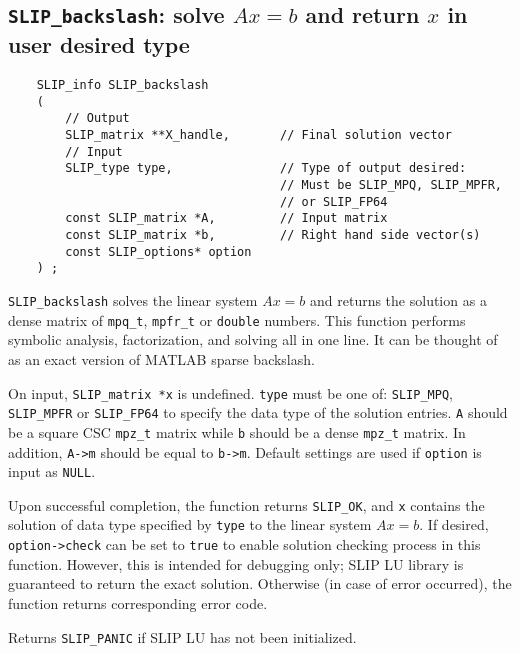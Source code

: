 \documentclass[12pt]{article}
\theoremstyle{definition}
\begin{document}
\newpage
\cprotect\subsection{\verb|SLIP_backslash|: solve $Ax=b$ and return $x$ in user desired type}
\label{ss:SLIP_backslash}

\begin{mdframed}[userdefinedwidth=6in]
{\footnotesize
\begin{verbatim}
    SLIP_info SLIP_backslash
    (
        // Output
        SLIP_matrix **X_handle,       // Final solution vector
        // Input
        SLIP_type type,               // Type of output desired:
                                      // Must be SLIP_MPQ, SLIP_MPFR,
                                      // or SLIP_FP64
        const SLIP_matrix *A,         // Input matrix
        const SLIP_matrix *b,         // Right hand side vector(s)
        const SLIP_options* option
    ) ;
\end{verbatim}
} \end{mdframed}

\verb|SLIP_backslash| solves the linear system $Ax=b$ and returns the solution
as a dense matrix of \verb|mpq_t|, \verb|mpfr_t| or \verb|double| numbers. This
function performs symbolic analysis, factorization, and solving all in one line. 
It can be thought of as an exact version of MATLAB sparse backslash.

On input, \verb|SLIP_matrix *x| is undefined. \verb|type| must be one of:
\verb|SLIP_MPQ|, \verb|SLIP_MPFR| or \verb|SLIP_FP64| to specify the data type
of the solution entries. \verb|A| should be a square CSC \verb|mpz_t| matrix
while \verb|b| should be a dense \verb|mpz_t| matrix. In addition, \verb|A->m|
should be equal to \verb|b->m|.  Default settings are used if
\verb|option| is input as \verb|NULL|.

Upon successful completion, the function returns \verb|SLIP_OK|, and
\verb|x| contains the solution of data type specified by
\verb|type| to the linear system $Ax=b$. If desired, \verb|option->check| can
be set to \verb|true| to enable solution checking process in this function.
However, this is intended for debugging only; SLIP LU library is guaranteed to
return the exact solution. Otherwise (in case of error occurred), the function
returns corresponding error code.

Returns \verb|SLIP_PANIC| if SLIP LU has not been initialized.
\end{document}
